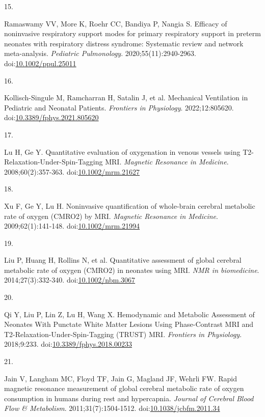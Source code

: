 \documentclass[
  letterpaper,
  DIV=11,
  numbers=noendperiod]{scrartcl}
\newlength{\cslhangindent}
\newlength{\csllabelwidth}
\newenvironment{CSLReferences}[2] %
 {\begin{list}{}{%
  \setlength{\itemindent}{0pt}
  \setlength{\leftmargin}{0pt}
  \setlength{\parsep}{0pt}
  \ifodd #1
   \setlength{\leftmargin}{\cslhangindent}
   \setlength{\itemindent}{-1\cslhangindent}
  \fi
  \setlength{\itemsep}{#2\baselineskip}}}
 {\end{list}}
\newcommand{\CSLLeftMargin}[1]{\parbox[t]{\csllabelwidth}{\strut#1\strut}}
\newcommand{\CSLRightInline}[1]{\parbox[t]{\linewidth - \csllabelwidth}{\strut#1\strut}}
\begin{document}
\begin{CSLReferences}{0}{1}
\CSLLeftMargin{15. }%
\CSLRightInline{Ramaswamy VV, More K, Roehr CC, Bandiya P, Nangia S.
Efficacy of noninvasive respiratory support modes for primary
respiratory support in preterm neonates with respiratory distress
syndrome: {Systematic} review and network meta-analysis. \emph{Pediatric
Pulmonology}. 2020;55(11):2940-2963.
doi:\href{https://doi.org/10.1002/ppul.25011}{10.1002/ppul.25011}}

\CSLLeftMargin{16. }%
\CSLRightInline{Kollisch-Singule M, Ramcharran H, Satalin J, et al.
Mechanical {Ventilation} in {Pediatric} and {Neonatal Patients}.
\emph{Frontiers in Physiology}. 2022;12:805620.
doi:\href{https://doi.org/10.3389/fphys.2021.805620}{10.3389/fphys.2021.805620}}

\CSLLeftMargin{17. }%
\CSLRightInline{Lu H, Ge Y. Quantitative evaluation of oxygenation in
venous vessels using {T2-Relaxation-Under-Spin-Tagging MRI}.
\emph{Magnetic Resonance in Medicine}. 2008;60(2):357-363.
doi:\href{https://doi.org/10.1002/mrm.21627}{10.1002/mrm.21627}}

\CSLLeftMargin{18. }%
\CSLRightInline{Xu F, Ge Y, Lu H. Noninvasive quantification of
whole-brain cerebral metabolic rate of oxygen ({CMRO2}) by {MRI}.
\emph{Magnetic Resonance in Medicine}. 2009;62(1):141-148.
doi:\href{https://doi.org/10.1002/mrm.21994}{10.1002/mrm.21994}}

\CSLLeftMargin{19. }%
\CSLRightInline{Liu P, Huang H, Rollins N, et al. Quantitative
assessment of global cerebral metabolic rate of oxygen ({CMRO2}) in
neonates using {MRI}. \emph{NMR in biomedicine}. 2014;27(3):332-340.
doi:\href{https://doi.org/10.1002/nbm.3067}{10.1002/nbm.3067}}

\CSLLeftMargin{20. }%
\CSLRightInline{Qi Y, Liu P, Lin Z, Lu H, Wang X. Hemodynamic and
{Metabolic Assessment} of {Neonates With Punctate White Matter Lesions
Using Phase-Contrast MRI} and {T2-Relaxation-Under-Spin-Tagging}
({TRUST}) {MRI}. \emph{Frontiers in Physiology}. 2018;9:233.
doi:\href{https://doi.org/10.3389/fphys.2018.00233}{10.3389/fphys.2018.00233}}

\CSLLeftMargin{21. }%
\CSLRightInline{Jain V, Langham MC, Floyd TF, Jain G, Magland JF, Wehrli
FW. Rapid magnetic resonance measurement of global cerebral metabolic
rate of oxygen consumption in humans during rest and hypercapnia.
\emph{Journal of Cerebral Blood Flow \& Metabolism}.
2011;31(7):1504-1512.
doi:\href{https://doi.org/10.1038/jcbfm.2011.34}{10.1038/jcbfm.2011.34}}


\end{CSLReferences}
\end{document}
